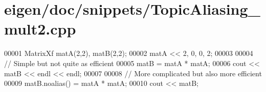 \hypertarget{eigen_2doc_2snippets_2_topic_aliasing__mult2_8cpp_source}{}\section{eigen/doc/snippets/\+Topic\+Aliasing\+\_\+mult2.cpp}
\label{eigen_2doc_2snippets_2_topic_aliasing__mult2_8cpp_source}

\begin{DoxyCode}
00001 MatrixXf matA(2,2), matB(2,2); 
00002 matA << 2, 0,  0, 2;
00003 
00004 \textcolor{comment}{// Simple but not quite as efficient}
00005 matB = matA * matA;
00006 cout << matB << endl << endl;
00007 
00008 \textcolor{comment}{// More complicated but also more efficient}
00009 matB.noalias() = matA * matA;
00010 cout << matB;
\end{DoxyCode}
